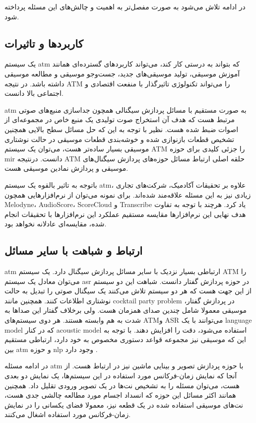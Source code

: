در ادامه تلاش می‌شود به صورت مفصل‌تر به اهمیت و چالش‌های این مسئله پرداخته شود.

\subsection{کاربردها و تاثیرات}
یک سیستم \gls{atm} که بتواند به درستی کار کند، می‌تواند کاربردهای گسترده‌ای
همانند آموزش موسیقی، تولید موسیقی‌های جدید، جست‌وجو موسیقی و مطالعه موسیقی داشته
باشد. در نتیجه \gls{ATM} را می‌تواند تکنولوژی تاثیرگذار با منفعت اقتصادی و
اجتماعی بالا دانست.

\gls{atm} به صورت مستقیم با مسائل پردازش سیگنالی همچون جداسازی منبع‌های صوتی
مرتبط هست که هدف آن استخراج صوت تولیدی یک منبع خاص در مجموعه‌ای از اصوات ضبط شده
هست. نظیر با توجه به این که حل مسائل سطح بالایی همچنین تشخیص قطعات بازنوازی
شده و خوشه‌بندی قطعات موسیقی در حالت نوشتاری موسیقی بسیار ساده‌تر هست، می‌توان
یک سیستم \gls{ATM} را جزئی کلیدی برای حوزه \gls{mir} دانست. درنتیجه \gls{ATM}
حلقه اصلی ارتباط مسائل حوزه‌های پردازش سیگنال‌های موسیقی و پردازش نمادین موسیقی
هست.

باتوجه به تاثیر بالقوه یک سیستم \gls{atm}، علاوه بر تحقیقات آکادمیک، شرکت‌های
تجاری زیادی نیز به این مسئله علاقه‌مند شده‌اند. برای نمونه می‌توان از
نرم‌افزارهایی همچون Melodyne، AudioScore، ScoreCloud و Transcribe یاد کرد. هرچند
با توجه به تفاوت هدف نهایی این نرم‌افزارها مقایسه مستقیم عملکرد این نرم‌افزارها
با تحقیقات انجام شده، مقایسه‌ای عادلانه نخواهد بود.

\subsection{ارتباط و شباهت با سایر مسائل}
\gls{atm} ارتباطی بسیار نزدیک با سایر مسائل پردازش سیگنال دارد. یک سیستم
\gls{ATM} را می‌توان معادل یک سیستم \gls{asr} در حوزه پردازش گفتار دانست. شباهت
این دو سیستم از این جهت هست که هر دو سیستم تلاش می‌کنند یک سیگنال صوتی را تبدیل
به حالت نوشتاری اطلاعات کنند. همچنین مانند \gls{cocktail party problem} در
پردازش گفتار، موسیقی معمولا شامل چندین صدای همزمان هست. ولی برخلاف گفتار این
صداها به شدت به هم وابسته هستند. هر دوی سیستم‌های \gls{ATM}و \gls{ASR} می‌توانند
با یک \gls{language model} که در کنار \gls{acoustic model} استفاده می‌شود، دقت
را افزایش دهند. با توجه به این که موسیقی نیز مجموعه قواعد دستوری مخصوص به خود
دارد، ارتباطی مستقیم بین \gls{atm} و حوزه \gls{nlp} وجود دارد
\cite{boulanger2012modeling}.

در ادامه مسئله \gls{atm} با حوزه پردازش تصویر و بینایی ماشین نیز در ارتباط هست.
از آنجا که نمایش زمان-فرکانس مورد استفاده در این سیستم‌ها، یک نمایش دو بعدی هست،
می‌توان مسئله را به تشخیص نت‌ها در یک تصویر ورودی تقلیل داد. همچنین همانند اکثر
مسائل این حوزه که انسداد اجسام مورد مطالعه چالشی جدی هست، نت‌های موسیقی استفاده
شده در یک قطعه نیز، معمولا فضای یکسانی را در نمایش زمان-فرکانس مورد استفاده
اشغال می‌کنند.

